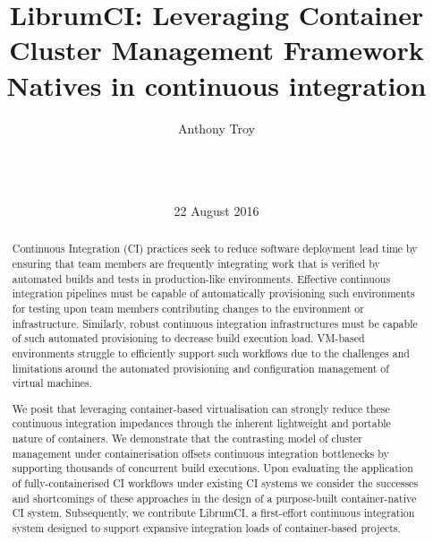 \documentclass{report}
\begin{document}
\title{LibrumCI: Leveraging Container Cluster Management Framework Natives in continuous integration}

\author{
\alignauthor
Anthony Troy\\
       \\
       \\
       \\
}

\date{22 August 2016}

\maketitle

\begin{abstract}
Continuous Integration (CI) practices seek to reduce software deployment lead time
by ensuring that team members are frequently integrating work that is 
verified by automated builds and tests in production-like environments. 
Effective continuous integration pipelines must be capable of automatically
provisioning such environments for testing upon team members contributing 
changes to the environment or infrastructure. Similarly,
robust continuous integration infrastructures must be capable of such
automated provisioning to decrease build execution load. VM-based environments
struggle to efficiently support such workflows due to the challenges and limitations 
around the automated provisioning and configuration management of virtual machines.
\par
We posit that leveraging container-based virtualisation can strongly reduce
these continuous integration impedances through the inherent lightweight and portable nature of containers. 
We demonstrate that the contrasting model of cluster management under containerisation offsets continuous
integration bottlenecks by supporting thousands of concurrent build executions.
Upon evaluating the application of fully-containerised CI workflows under existing CI systems 
we consider the successes and shortcomings of these approaches in the design of a purpose-built container-native
CI system. Subsequently, we contribute LibrumCI, a first-effort continuous integration system designed 
to support expansive integration loads of container-based projects. 

\end{abstract}
\end{document}
